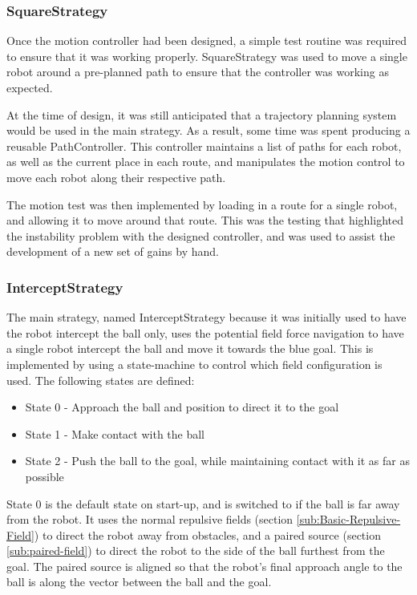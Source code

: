 \documentclass[10pt]{article} \usepackage[a4paper]{geometry}
\begin{document}
\subsubsection{SquareStrategy}

Once the motion controller had been designed, a simple test routine was required
to ensure that it was working properly.  SquareStrategy was used to move a
single robot around a pre-planned path to ensure that the controller was working
as expected.

At the time of design, it was still anticipated that a trajectory planning
system would be used in the main strategy.  As a result, some time was spent
producing a reusable PathController.  This controller maintains a list of paths
for each robot, as well as the current place in each route, and manipulates the
motion control to move each robot along their respective path.

The motion test was then implemented by loading in a route for a single robot,
and allowing it to move around that route.  This was the testing that
highlighted the instability problem with the designed controller, and was used
to assist the development of a new set of gains by hand.

\subsubsection{InterceptStrategy}

The main strategy, named InterceptStrategy because it was initially used to have
the robot intercept the ball only, uses the potential field force navigation to
have a single robot intercept the ball and move it towards the blue goal.  This
is implemented by using a state-machine to control which field configuration is
used.  The following states are defined:

\begin{itemize}
  \item State 0 - Approach the ball and position to direct it to the goal
  \item State 1 - Make contact with the ball
  \item State 2 - Push the ball to the goal, while maintaining contact with it
  as far as possible
\end{itemize}

State 0 is the default state on start-up, and is switched to if the ball is far
away from the robot.  It uses the normal repulsive fields (section
\ref{sub:Basic-Repulsive-Field}) to direct the robot away from obstacles, and a
paired source (section \ref{sub:paired-field}) to direct the robot to the side
of the ball furthest from the goal.  The paired source is aligned so that the
robot's final approach angle to the ball is along the vector between the ball
and the goal.
\end{document}
